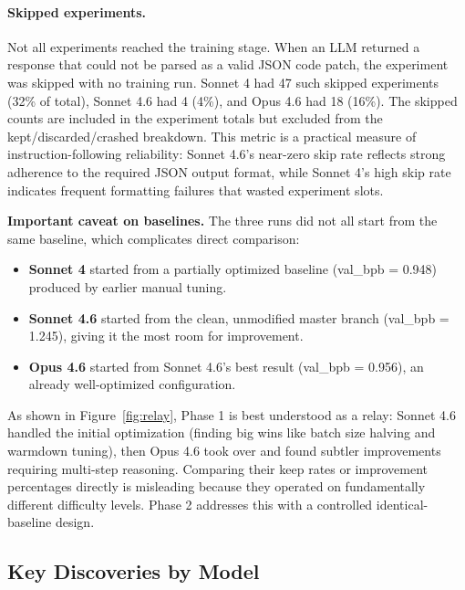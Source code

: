 \documentclass[11pt]{article}
\begin{document}
\paragraph{Skipped experiments.} Not all experiments reached the training stage. When an LLM returned a response that could not be parsed as a valid JSON code patch, the experiment was skipped with no training run. Sonnet 4 had 47 such skipped experiments (32\% of total), Sonnet 4.6 had 4 (4\%), and Opus 4.6 had 18 (16\%). The skipped counts are included in the experiment totals but excluded from the kept/discarded/crashed breakdown. This metric is a practical measure of instruction-following reliability: Sonnet 4.6's near-zero skip rate reflects strong adherence to the required JSON output format, while Sonnet 4's high skip rate indicates frequent formatting failures that wasted experiment slots.

\textbf{Important caveat on baselines.} The three runs did not all start from the same baseline, which complicates direct comparison:

\begin{itemize}[leftmargin=*]
    \item \textbf{Sonnet 4} started from a partially optimized baseline (val\_bpb = 0.948) produced by earlier manual tuning.
    \item \textbf{Sonnet 4.6} started from the clean, unmodified master branch (val\_bpb = 1.245), giving it the most room for improvement.
    \item \textbf{Opus 4.6} started from Sonnet 4.6's best result (val\_bpb = 0.956), an already well-optimized configuration.
\end{itemize}

As shown in Figure~\ref{fig:relay}, Phase 1 is best understood as a relay: Sonnet 4.6 handled the initial optimization (finding big wins like batch size halving and warmdown tuning), then Opus 4.6 took over and found subtler improvements requiring multi-step reasoning. Comparing their keep rates or improvement percentages directly is misleading because they operated on fundamentally different difficulty levels. Phase 2 addresses this with a controlled identical-baseline design.

\subsection{Key Discoveries by Model}
\label{sec:discoveries}
\end{document}
